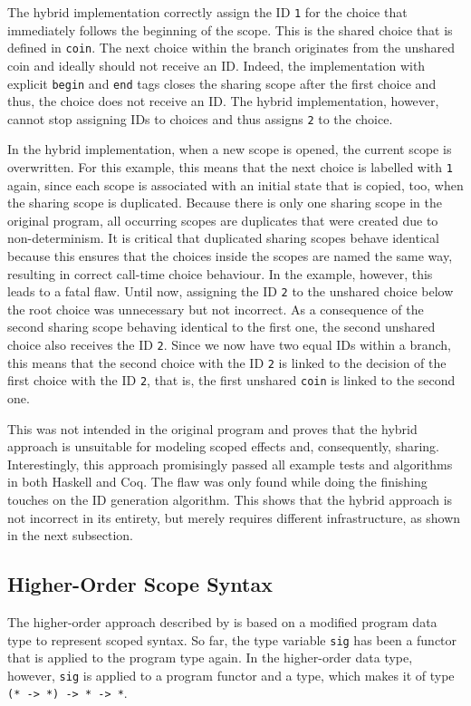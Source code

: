 \documentclass[a4paper, 11pt, fleqn, twoside]{scrreprt}
\newcommand{\hinl}[1]{\texttt{#1}}
\begin{document}
The hybrid implementation correctly assign the ID \hinl{1} for the choice that immediately follows the beginning of the scope.
This is the shared choice that is defined in \hinl{coin}.
The next choice within the branch originates from the unshared coin and ideally should not receive an ID.
Indeed, the implementation with explicit \hinl{begin} and \hinl{end} tags closes the sharing scope after the first choice and thus, the choice does not receive an ID.
The hybrid implementation, however, cannot stop assigning IDs to choices and thus assigns \hinl{2} to the choice.

In the hybrid implementation, when a new scope is opened, the current scope is overwritten.
For this example, this means that the next choice is labelled with \hinl{1} again, since each scope is associated with an initial state that is copied, too, when the sharing scope is duplicated.
Because there is only one sharing scope in the original program, all occurring scopes are duplicates that were created due to non-determinism.
It is critical that duplicated sharing scopes behave identical because this ensures that the choices inside the scopes are named the same way, resulting in correct call-time choice behaviour.
In the example, however, this leads to a fatal flaw.
Until now, assigning the ID \hinl{2} to the unshared choice below the root choice was unnecessary but not incorrect.
As a consequence of the second sharing scope behaving identical to the first one, the second unshared choice also receives the ID \hinl{2}.
Since we now have two equal IDs within a branch, this means that the second choice with the ID \hinl{2} is linked to the decision of the first choice with the ID \hinl{2}, that is, the first unshared \hinl{coin} is linked to the second one.

This was not intended in the original program and proves that the hybrid approach is unsuitable for modeling scoped effects and, consequently, sharing.
Interestingly, this approach promisingly passed all example tests and algorithms in both Haskell and Coq.
The flaw was only found while doing the finishing touches on the ID generation algorithm.
This shows that the hybrid approach is not incorrect in its entirety, but merely requires different infrastructure, as shown in the next subsection.

\subsection{Higher-Order Scope Syntax}
\label{subsec:HOscopesyntax}
The higher-order approach described by \citet{wu2014effect} is based on a modified  program data type to represent scoped syntax.
So far, the type variable \hinl{sig} has been a functor that is applied to the program type again.
In the higher-order data type, however, \hinl{sig} is applied to a program functor and a type, which makes it of type \hinl{(* -> *) -> * -> *}.
\end{document}
